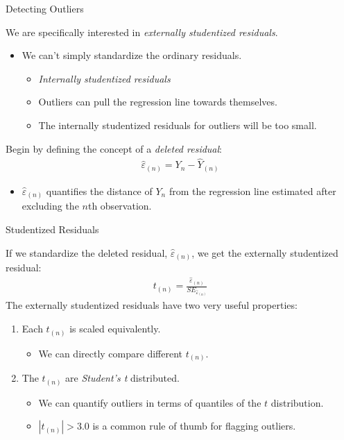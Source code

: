 \documentclass[10pt]{beamer}\usepackage[]{graphicx}\usepackage[]{color}
\begin{document}

\begin{frame}{Detecting Outliers}

  We are specifically interested in \emph{externally studentized residuals}.
  \vb
  \begin{itemize}
  \item We can't simply standardize the ordinary residuals.
    \begin{itemize}
    \item \emph{Internally studentized residuals}
      \vc
    \item Outliers can pull the regression line towards themselves.
      \vc
    \item The internally studentized residuals for outliers will be too small.
    \end{itemize}
  \end{itemize}
  \vb
  Begin by defining the concept of a \emph{deleted residual}:
  \begin{align*}
    \hat{\varepsilon}_{(n)} = Y_n - \hat{Y}_{(n)}
  \end{align*}
  \begin{itemize}
    \item $\hat{\varepsilon}_{(n)}$ quantifies the distance of $Y_n$ from the
      regression line estimated after excluding the $n$th observation.
  \end{itemize}

\end{frame}


\begin{frame}{Studentized Residuals}

  If we standardize the deleted residual, $\hat{\varepsilon}_{(n)}$, we get the
  externally studentized residual:
  \begin{align*}
    t_{(n)} = \frac{\hat{\varepsilon}_{(n)}}{SE_{\hat{\varepsilon}_{(n)}}}
  \end{align*}
  The externally studentized residuals have two very useful properties:
  \vb
  \begin{enumerate}
  \item Each $t_{(n)}$ is scaled equivalently.
    \vc
    \begin{itemize}
    \item We can directly compare different $t_{(n)}$.
    \end{itemize}
    \vb
  \item The $t_{(n)}$ are \emph{Student's t} distributed.
    \vc
    \begin{itemize}
    \item We can quantify outliers in terms of quantiles of the $t$
      distribution.
      \vc
    \item $|t_{(n)}| > 3.0$ is a common rule of thumb for flagging outliers.
    \end{itemize}
  \end{enumerate}

\end{frame}
\end{document}
